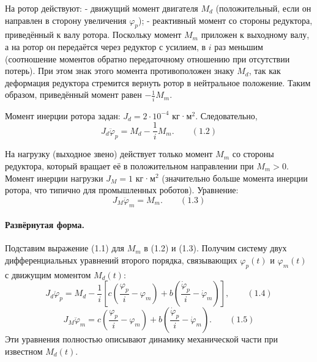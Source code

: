 \documentclass[a4paper, 14pt]{extarticle}
\begin{document}
    На ротор действуют:
    - движущий момент двигателя $M_d$ (положительный, если он направлен в сторону увеличения $\varphi_p$);
    - реактивный момент со стороны редуктора, приведённый к валу ротора. Поскольку момент $M_m$ приложен к выходному валу, а на ротор он передаётся через редуктор с усилием, в $i$ раз меньшим (соотношение моментов обратно передаточному отношению при отсутствии потерь). При этом знак этого момента противоположен знаку $M_d$, так как деформация редуктора стремится вернуть ротор в нейтральное положение. Таким образом, приведённый момент равен $-\frac{1}{i} M_m$.

    Момент инерции ротора задан: $J_d = 2\cdot10^{-4}$ кг·м$^2$. Следовательно,
    \[
    J_d \ddot{\varphi}_p = M_d - \frac{1}{i} M_m. \qquad (1.2)
    \]

    На нагрузку (выходное звено) действует только момент $M_m$ со стороны редуктора, который вращает её в положительном направлении при $M_m>0$. Момент инерции нагрузки $J_M = 1$ кг·м$^2$ (значительно больше момента инерции ротора, что типично для промышленных роботов). Уравнение:
    \[
    J_M \ddot{\varphi}_m = M_m. \qquad (1.3)
    \]

    \paragraph{Развёрнутая форма.}
    Подставим выражение (1.1) для $M_m$ в (1.2) и (1.3). Получим систему двух дифференциальных уравнений второго порядка, связывающих $\varphi_p(t)$ и $\varphi_m(t)$ с движущим моментом $M_d(t)$:
    \[
    J_d \ddot{\varphi}_p = M_d - \frac{1}{i}\left[c\left(\frac{\varphi_p}{i} - \varphi_m\right) + b\left(\frac{\dot{\varphi}_p}{i} - \dot{\varphi}_m\right)\right], \qquad (1.4)
    \]
    \[
    J_M \ddot{\varphi}_m = c\left(\frac{\varphi_p}{i} - \varphi_m\right) + b\left(\frac{\dot{\varphi}_p}{i} - \dot{\varphi}_m\right). \qquad (1.5)
    \]
    Эти уравнения полностью описывают динамику механической части при известном $M_d(t)$.
\end{document}
